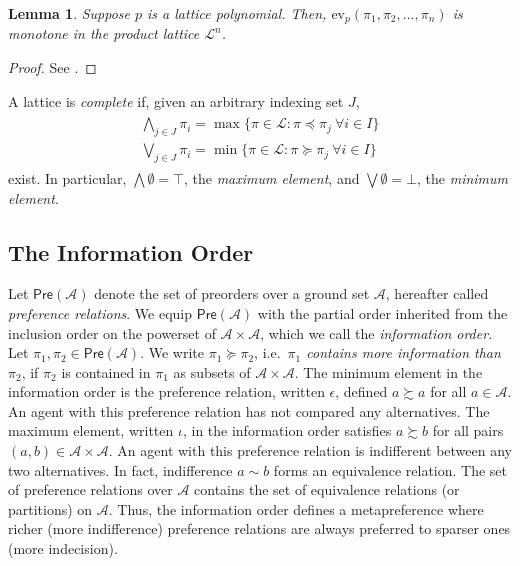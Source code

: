 \documentclass[conference]{ieeeconf}
\newcommand{\A}{\mathcal{A}}
\newcommand{\Pref}{\mathsf{Pre}}
\renewcommand{\L}{\mathcal{L}}
\newcommand{\prefers}{\succsim}
\newcommand{\bigjoin}{\bigvee}
\newcommand{\bigmeet}{\bigwedge}
\newtheorem{lemma}{Lemma}
\begin{document}
\begin{lemma} \label{lem:lattice-polynomial}
    Suppose $p$ is a lattice polynomial. Then, $\mathrm{ev}_p(\pi_1,\pi_2,\dots,\pi_n)$ is monotone in the product lattice $\L^n$.
\end{lemma}
\begin{proof}
    See \cite[\S I.5 Lemma 4]{birkhoff1940}.
\end{proof}

A lattice is \emph{complete} if, given an arbitrary indexing set $J$,
\begin{align}
    \begin{aligned}
        \bigmeet_{j \in J} \pi_i = \max\{\pi \in \L : \pi \preceq \pi_j~\forall i \in I\} \\
        \bigjoin_{j \in J} \pi_i = \min\{\pi \in \L : \pi \succeq \pi_j~\forall i \in I\}
    \end{aligned} \label{eq:complete lattice}
\end{align}
exist. In particular, $\bigmeet \emptyset = \top$, the \emph{maximum element}, and $\bigjoin \emptyset = \bot$, the \emph{minimum element}.



\subsection{The Information Order}

Let $\Pref(\A)$ denote the set of preorders over a ground set $\A$, hereafter called \emph{preference relations}. We equip $\Pref(\A)$ with the partial order inherited from the inclusion order on the powerset of $\A \times \A$, which we call the \emph{information order}. Let $\pi_1, \pi_2 \in \Pref(\A)$. We write $\pi_1 \succeq \pi_2$, i.e.~{\it $\pi_1$ contains more information than $\pi_2$}, if $\pi_2$ is contained in $\pi_1$ as subsets of $\A \times \A$. The minimum element in the information order is the preference relation, written $\epsilon$, defined $a \prefers a$ for all $a \in \A$. An agent with this preference relation has not compared any alternatives. The maximum element, written $\iota$, in the information order satisfies $a \prefers b$ for all pairs $(a,b) \in \A \times \A$. An agent with this preference relation is indifferent between any two alternatives. In fact, indifference $a \sim b$ forms an equivalence relation. The set of preference relations over $\A$ contains the set of equivalence relations (or partitions) on $\A$. Thus, the information order defines a metapreference where richer (more indifference) preference relations are always preferred to sparser ones (more indecision).
\end{document}
